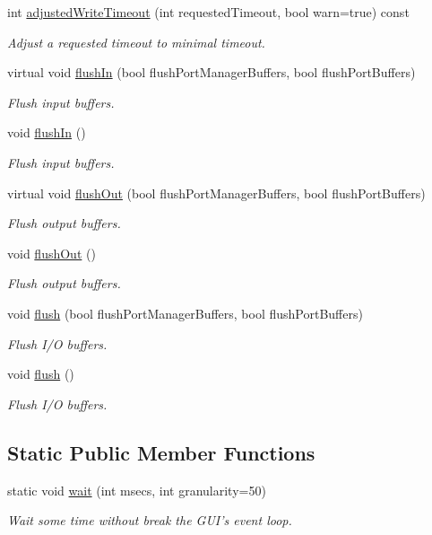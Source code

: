 \begin{DoxyCompactItemize}
int \hyperlink{classmdt_port_manager_a9d6782be514745a1b1392216d17d41df}{adjustedWriteTimeout} (int requestedTimeout, bool warn=true) const 
\begin{DoxyCompactList}\small\item\em Adjust a requested timeout to minimal timeout. \end{DoxyCompactList}\item 
virtual void \hyperlink{classmdt_port_manager_ac0844a5cd4043a95a479d458ac7ce590}{flushIn} (bool flushPortManagerBuffers, bool flushPortBuffers)
\begin{DoxyCompactList}\small\item\em Flush input buffers. \end{DoxyCompactList}\item 
void \hyperlink{classmdt_port_manager_a4c44ce6ec40c4afc6be441c10d7ee827}{flushIn} ()
\begin{DoxyCompactList}\small\item\em Flush input buffers. \end{DoxyCompactList}\item 
virtual void \hyperlink{classmdt_port_manager_a3f0c2722a41c49de2bea9013bccd049c}{flushOut} (bool flushPortManagerBuffers, bool flushPortBuffers)
\begin{DoxyCompactList}\small\item\em Flush output buffers. \end{DoxyCompactList}\item 
void \hyperlink{classmdt_port_manager_ab34018a9653a5af784fa7da06a9e50d3}{flushOut} ()
\begin{DoxyCompactList}\small\item\em Flush output buffers. \end{DoxyCompactList}\item 
void \hyperlink{classmdt_port_manager_a97b91e7c1641836eb6afb47fd244a18e}{flush} (bool flushPortManagerBuffers, bool flushPortBuffers)
\begin{DoxyCompactList}\small\item\em Flush I/O buffers. \end{DoxyCompactList}\item 
void \hyperlink{classmdt_port_manager_a3eab774008d7530ae341ce9c38265d65}{flush} ()
\begin{DoxyCompactList}\small\item\em Flush I/O buffers. \end{DoxyCompactList}\end{DoxyCompactItemize}
\subsection*{Static Public Member Functions}
\begin{DoxyCompactItemize}
\item 
static void \hyperlink{classmdt_port_manager_acc5c63ad33fdd3cc153fc23e00c6e69c}{wait} (int msecs, int granularity=50)
\begin{DoxyCompactList}\small\item\em Wait some time without break the GUI's event loop. \end{DoxyCompactList}\end{DoxyCompactItemize}
